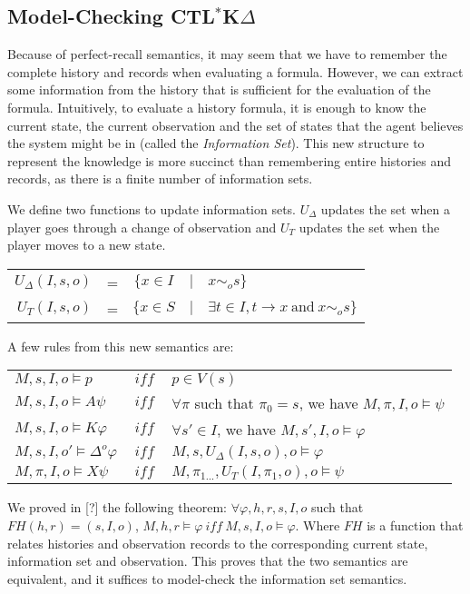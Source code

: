 \documentclass[dvipsnames]{acmart}
\def\ctlskd{CTL$^{*}$K$\Delta$}
\def\A{\mathit{A}}
\def\X{\mathit{X}}
\def\K{\mathit{K}}
\def\D#1{\Delta^{#1}}
\def\eqstate#1{\sim_{#1}}
\def\iff{\ \mathit{iff}\ }
\def\UD{U_{\Delta}}
\def\UT{U_T}
\def\FV{\mathit{FH}}
\begin{document}
\subsection{Model-Checking \ctlskd}
Because of perfect-recall semantics, it may seem that we have to remember the complete history and records when evaluating a formula. However, we can extract some information from the history that is sufficient for the evaluation of the formula. Intuitively, to evaluate a history formula, it is enough to know the current state, the current observation and the set of states that the agent believes the system might be in (called the \textit{Information Set}). This new structure to represent the knowledge is more succinct than remembering entire histories and records, as there is a finite number of information sets.

We define two functions to update information sets. $\UD$ updates the set when a player goes through a change of observation and $\UT$ updates the set when the player moves to a new state. 
\begin{tabular}{r c c c l}
$\UD(I,s,o)$& = &$\{x\in I$ & $|$ & $x\eqstate{o}s\}$\\
$\UT(I,s,o)$& = &$\{x\in S$ & $|$ & $\exists t\in I, t\rightarrow x ~\text{and}~ x\eqstate{o}s\}$\\
\end{tabular}

A few rules from this new semantics are:
\begin{tabular}{l c l}
  $M,s,I,o\models p $&$ \iff $&$ p\in V(s)$\\
  $M,s,I,o\models\A\psi $&$ \iff $&$ \forall\pi$ such that $\pi_0=s$, we have $M,\pi,I,o\models\psi$\\
  $M,s,I,o\models\K\varphi $&$ \iff $&$ \forall s'\in I$, we have $M,s',I,o\models\varphi$\\
  $M,s,I,o'\models\D{o}\varphi $&$ \iff $&$ M,s,\UD(I,s,o),o\models\varphi$\\
  $M,\pi,I,o\models\X\psi $&$ \iff $&$ M,\pi_{1\dots},\UT(I,\pi_1,o),o\models\psi$\\
\end{tabular}

We proved in [?] the following theorem:
$\forall \varphi,h,r,s,I,o$ such that $\FV(h,r)=(s,I,o)$, $M,h,r\models\varphi\iff M,s,I,o\models\varphi$.
Where $\FV$ is a function that relates histories and observation records to the corresponding current state, information set and observation.
This proves that the two semantics are equivalent, and it suffices to model-check the information set semantics.
\end{document}
